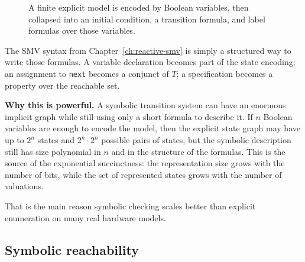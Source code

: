 \begin{figure}[ht]
  \centering
  \caption{A finite explicit model is encoded by Boolean variables, then
           collapsed into an initial condition, a transition formula, and
           label formulas over those variables.}
  \label{fig:smv-bridge}
\end{figure}

The SMV syntax from Chapter~\ref{ch:reactive-smv} is simply a structured way
to write those formulas.  A variable declaration becomes part of the state
encoding; an assignment to \texttt{next} becomes a conjunct of $T$; a
specification becomes a property over the reachable set.

\medskip\noindent
\textbf{Why this is powerful.}  A symbolic transition system can have an
enormous implicit graph while still using only a short formula to describe it.
If $n$ Boolean variables are enough to encode the model, then the explicit
state graph may have up to $2^n$ states and $2^n \cdot 2^n$ possible pairs of
states, but the symbolic description still has size polynomial in $n$ and in
the structure of the formulas.  This is the source of the exponential
succinctness: the representation size grows with the number of bits, while the
set of represented states grows with the number of valuations.

That is the main reason symbolic checking scales better than explicit
enumeration on many real hardware models.

\subsection{Symbolic reachability}

